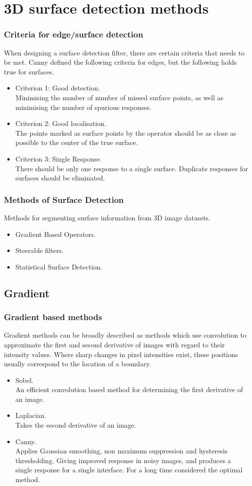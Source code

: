 \documentclass[9pt]{beamer}
\begin{document}
\section{3D surface detection methods}

\begin{frame}
\frametitle{ Criteria for edge/surface detection }
When designing a surface detection filter, there are certain criteria that needs to be met. Canny defined the following criteria for edges, but the following holds true for surfaces.
\begin{itemize}
\item Criterion 1: Good detection.\\
Minimising the number of number of missed surface points, as well as minimising the number of spurious responses.
\item Criterion 2: Good localisation.\\
The points marked as surface points by the operator should be as close as possible to the center of the true surface.
\item Criterion 3: Single Response.\\
There should be only one response to a single surface. Duplicate responses for surfaces should be eliminated.
\end{itemize}
\end{frame}
\begin{frame}
\frametitle{ Methods of Surface Detection}
Methods for segmenting surface information from 3D image datasets.
\begin{itemize}
\item Gradient Based Operators.
\item Steerable filters.
\item Statistical Surface Detection.
\end{itemize}
\end{frame}
\subsection{Gradient}
\begin{frame}
\frametitle{Gradient based methods}
Gradient methods can be broadly described as methods which use convolution to approximate the first and second derivative of images with regard to their intensity values. Where sharp changes in pixel intensities exist, these positions usually correspond to the location of a boundary.
\begin{itemize}
\item Sobel.\\
An efficient convolution based method for determining the first derivative of an image.
\item Laplacian. \\
Takes the second derivative of an image.
\item Canny.\\
Applies Gaussian smoothing, non maximum suppression and hysteresis thresholding. Giving improved response in noisy images, and produces a single response for a single interface. For a long time considered the optimal method.
\end{itemize}
\end{frame}
\end{document}
